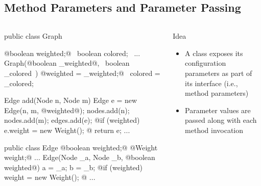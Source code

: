 \subsection{Method Parameters and Parameter Passing} %
\begin{frame}[fragile]{\myframetitle}
	\begin{columns}
\begin{tiny}
\begin{codetight}{}
public class Graph {
	@boolean weighted;@
	~boolean colored;~
	...
	Graph(@boolean _weighted@, ~boolean _colored~) {
		@weighted = _weighted;@
		~colored = _colored;~
	}
	
	Edge add(Node n, Node m) {
		Edge e = new Edge(n, m, @weighted@);
		nodes.add(n); nodes.add(m); edges.add(e);
		@if (weighted) { e.weight = new Weight(); }@
		return e;
	}
	...
}
\end{codetight}
\begin{codetight}{}
public class Edge {
	@boolean weighted;@
	@Weight weight;@ 
	...
	Edge(Node _a, Node _b, @boolean weighted@) {
		a = _a; b = _b;
		@if (weighted) { weight = new Weight(); }@
	}
	...
}
\end{codetight}
\end{tiny}	
			\begin{definition}{Idea}
				\begin{itemize}
					\item A class exposes its configuration parameters as part of its interface (i.e., method parameters)
					\item Parameter values are passed along with each method invocation
				\end{itemize}
			\end{definition}
	\end{columns}
\end{frame}


